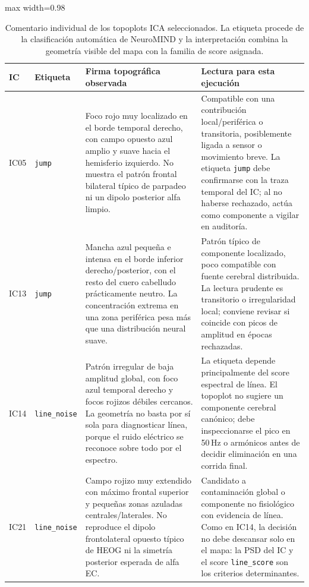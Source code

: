 \begin{table}[H]
\centering
\scriptsize
\caption{Comentario individual de los topoplots ICA seleccionados. La etiqueta procede de la clasificación automática de NeuroMIND y la interpretación combina la geometría visible del mapa con la familia de score asignada.}
\label{tab:results-ica-topomap-comments}
\begin{adjustbox}{max width=0.98\textwidth}
\begin{tabular}{@{}p{}p{}p{}p{}@{}}
\toprule
\textbf{IC} & \textbf{Etiqueta} & \textbf{Firma topográfica observada} & \textbf{Lectura para esta ejecución} \\
\midrule
IC05 & \texttt{jump} & Foco rojo muy localizado en el borde temporal derecho, con campo opuesto azul amplio y suave hacia el hemisferio izquierdo. No muestra el patrón frontal bilateral típico de parpadeo ni un dipolo posterior alfa limpio. & Compatible con una contribución local/periférica o transitoria, posiblemente ligada a sensor o movimiento breve. La etiqueta \texttt{jump} debe confirmarse con la traza temporal del IC; al no haberse rechazado, actúa como componente a vigilar en auditoría. \\
\addlinespace
IC13 & \texttt{jump} & Mancha azul pequeña e intensa en el borde inferior derecho/posterior, con el resto del cuero cabelludo prácticamente neutro. La concentración extrema en una zona periférica pesa más que una distribución neural suave. & Patrón típico de componente localizado, poco compatible con fuente cerebral distribuida. La lectura prudente es transitorio o irregularidad local; conviene revisar si coincide con picos de amplitud en épocas rechazadas. \\
\addlinespace
IC14 & \texttt{line\_noise} & Patrón irregular de baja amplitud global, con foco azul temporal derecho y focos rojizos débiles cercanos. La geometría no basta por sí sola para diagnosticar línea, porque el ruido eléctrico se reconoce sobre todo por el espectro. & La etiqueta depende principalmente del score espectral de línea. El topoplot no sugiere un componente cerebral canónico; debe inspeccionarse el pico en 50\,Hz o armónicos antes de decidir eliminación en una corrida final. \\
\addlinespace
IC21 & \texttt{line\_noise} & Campo rojizo muy extendido con máximo frontal superior y pequeñas zonas azuladas centrales/laterales. No reproduce el dipolo frontolateral opuesto típico de HEOG ni la simetría posterior esperada de alfa EC. & Candidato a contaminación global o componente no fisiológico con evidencia de línea. Como en IC14, la decisión no debe descansar solo en el mapa: la PSD del IC y el score \texttt{line\_score} son los criterios determinantes. \\
\bottomrule
\end{tabular}
\end{adjustbox}
\end{table}

